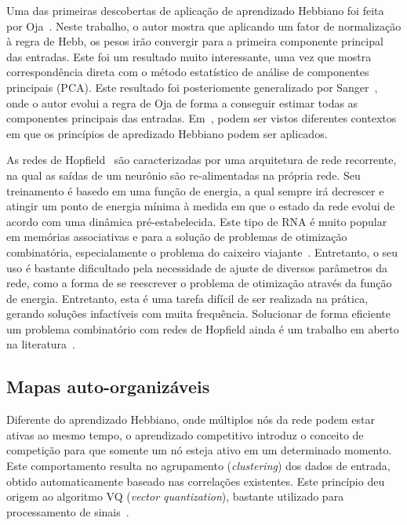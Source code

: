 \documentclass[conference]{IEEEtran}
\begin{document}
	Uma das primeiras descobertas de aplicação de aprendizado Hebbiano foi feita por Oja~\cite{oja1982simplified}. Neste trabalho, o autor mostra que aplicando um fator de normalização à regra de Hebb, os pesos irão convergir para a primeira componente principal das entradas. Este foi um resultado muito interessante, uma vez que mostra correspondência direta com o método estatístico de análise de componentes principais (PCA). Este resultado foi posteriomente generalizado por Sanger~\cite{sanger1989optimal}, onde o autor evolui a regra de Oja de forma a conseguir estimar todas as componentes principais das entradas. Em~\cite{linsker1988self}, podem ser vistos diferentes contextos em que os princípios de apredizado Hebbiano podem ser aplicados.
	
	As redes de Hopfield~\cite{hopfield1982neural} são caracterizadas por uma arquitetura de rede recorrente, na qual as saídas de um neurônio são re-alimentadas na própria rede. Seu treinamento é basedo em uma função de energia, a qual sempre irá decrescer e atingir um ponto de energia mínima à medida em que o estado da rede evolui de acordo com uma dinâmica pré-estabelecida. Este tipo de RNA é muito popular em memórias associativas e para a solução de problemas de otimização combinatória, especialamente o problema do caixeiro viajante~\cite{hopfield1985neural,smith1999neural}. Entretanto, o seu uso é bastante dificultado pela necessidade de ajuste de diversos parâmetros da rede, como a forma de se reescrever o problema de otimização através da função de energia. Entretanto, esta é uma tarefa difícil de ser realizada na prática, gerando soluções infactíveis com muita frequência. Solucionar de forma eficiente um problema combinatório com redes de Hopfield ainda é um trabalho em aberto na literatura~\cite{zhang2014comprehensive}.
	
	\subsection{Mapas auto-organizáveis}
	
	Diferente do aprendizado Hebbiano, onde múltiplos nós da rede podem estar ativas ao mesmo tempo, o aprendizado competitivo introduz o conceito de competição para que somente um nó esteja ativo em um determinado momento. Este comportamento resulta no agrupamento (\textit{clustering}) dos dados de entrada, obtido automaticamente baseado nas correlações existentes. Este princípio deu origem ao algoritmo VQ (\textit{vector quantization}), bastante utilizado para processamento de sinais~\cite{ahalt1990competitive}. 
	
\end{document}
